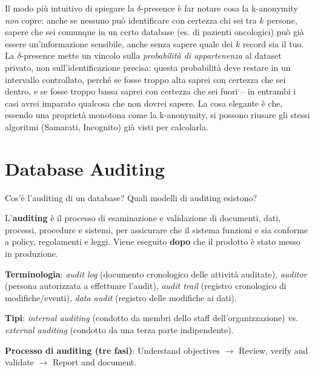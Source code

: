 \documentclass[a4paper,11pt]{article}
\begin{document}
\begin{nota}
Il modo pi\`{u} intuitivo di spiegare la $\delta$-presence \`{e} far notare cosa la k-anonymity \emph{non} copre: anche se nessuno pu\`{o} identificare con certezza chi sei tra $k$ persone, sapere che sei comunque in un certo database (es. di pazienti oncologici) pu\`{o} gi\`{a} essere un'informazione sensibile, anche senza sapere quale dei $k$ record sia il tuo. La $\delta$-presence mette un vincolo sulla \emph{probabilit\`{a} di appartenenza} al dataset privato, non sull'identificazione precisa: questa probabilit\`{a} deve restare in un intervallo controllato, perch\'{e} se fosse troppo alta saprei con certezza che sei dentro, e se fosse troppo bassa saprei con certezza che sei fuori -- in entrambi i casi avrei imparato qualcosa che non dovrei sapere. La cosa elegante \`{e} che, essendo una propriet\`{a} monotona come la k-anonymity, si possono riusare gli stessi algoritmi (Samarati, Incognito) gi\`{a} visti per calcolarla.
\end{nota}

\section{Database Auditing}

\begin{domanda}
Cos'\`{e} l'auditing di un database? Quali modelli di auditing esistono?
\end{domanda}

L'\textbf{auditing} \`{e} il processo di esaminazione e validazione di documenti, dati, processi, procedure e sistemi, per assicurare che il sistema funzioni e sia conforme a policy, regolamenti e leggi. Viene eseguito \textbf{dopo} che il prodotto \`{e} stato messo in produzione.

\textbf{Terminologia}: \emph{audit log} (documento cronologico delle attivit\`{a} auditate), \emph{auditor} (persona autorizzata a effettuare l'audit), \emph{audit trail} (registro cronologico di modifiche/eventi), \emph{data audit} (registro delle modifiche ai dati).

\textbf{Tipi}: \emph{internal auditing} (condotto da membri dello staff dell'organizzazione) vs. \emph{external auditing} (condotto da una terza parte indipendente).

\textbf{Processo di auditing (tre fasi)}: Understand objectives $\to$ Review, verify and validate $\to$ Report and document.
\end{document}
